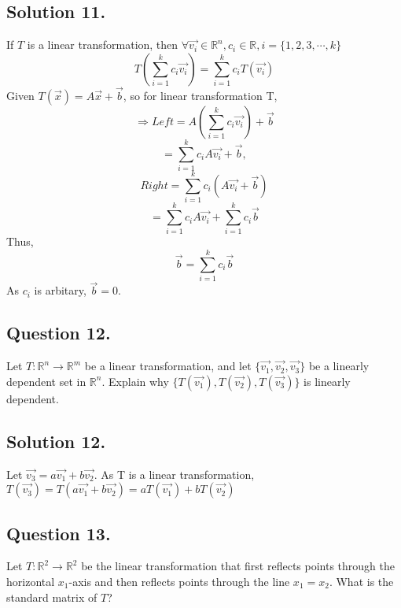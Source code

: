 \documentclass{article}
\begin{document}
\subsection*{Solution 11.}
If $T$ is a linear transformation, then $\forall \vec{v_i}\in\mathbb{R}^n,c_i\in \mathbb{R}, i=\{1,2,3,\cdots,k\}$
\[T(\sum_{i=1}^k c_i\vec{v_i})=\sum_{i=1}^k c_i T(\vec{v_i})\]
Given $T(\Vec{x})=A\Vec{x}+\Vec{b}$, so for linear transformation T,
\[\Rightarrow Left=A(\sum_{i=1}^k c_i\vec{v_i})+\vec{b}\]
\[=\sum_{i=1}^k c_i A\vec{v_i} +\vec{b},\]
\[Right=\sum_{i=1}^k c_i (A\vec{v_i}+\vec{b})\]
\[=\sum_{i=1}^k c_i A\vec{v_i}+\sum_{i=1}^k c_i\vec{b}\]
Thus,
\[\vec{b}=\sum_{i=1}^k c_i\vec{b}\]
As $c_i$ is arbitary, $\vec{b}=0$.
\subsection*{Question 12.}
Let $T:\mathbb{R}^n \rightarrow \mathbb{R}^m$ be a linear transformation, and let $\{\Vec{v_1},\Vec{v_2},\Vec{v_3}\}$ be a linearly dependent set in $\mathbb{R}^n$. Explain why $\{T(\Vec{v_1}),T(\Vec{v_2}),T(\Vec{v_3})\}$ is linearly dependent.
\subsection*{Solution 12.}
Let $\vec{v_3}=a\vec{v_1}+b\vec{v_2}$. As T is a linear transformation,
$T(\vec{v_3})=T(a\vec{v_1}+b\vec{v_2})=aT(\vec{v_1})+bT(\vec{v_2})$
\subsection*{Question 13.}
Let $T:\mathbb{R}^2\rightarrow \mathbb{R}^2$ be the linear transformation that first reflects points through the horizontal $x_1$-axis and then reflects points through the line $x_1=x_2$. What is the standard matrix of $T$?
\end{document}
